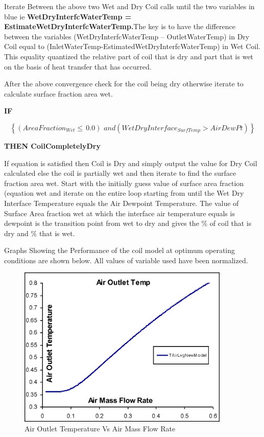 Iterate Between the above two Wet and Dry Coil calls until the two variables in blue ie \textbf{WetDryInterfcWaterTemp = EstimateWetDryInterfcWaterTemp.}The key is to have the difference between the variables (WetDryInterfcWaterTemp -- OutletWaterTemp) in Dry Coil equal to (InletWaterTemp-EstimatedWetDryInterfcWaterTemp) in Wet Coil. This equality quantized the relative part of coil that is dry and part that is wet on the basis of heat transfer that has occurred.

After the above convergence check for the coil being dry otherwise iterate to calculate surface fraction area wet.

\textbf{IF}

\begin{equation}
\left\{ {(AreaFractio{n_{Wet}} \le \,0.0)\,\,and(WetDryInterfac{e_{SurfTemp}} > AirDewPt)} \right\}
\end{equation}

\textbf{THEN CoilCompletelyDry}

If equation is satisfied then Coil is Dry and simply output the value for Dry Coil calculated else the coil is partially wet and then iterate to find the surface fraction area wet. Start with the initially guess value of surface area fraction (equation wet and iterate on the entire loop starting from until the Wet Dry Interface Temperature equals the Air Dewpoint Temperature. The value of Surface Area fraction wet at which the interface air temperature equals is dewpoint is the transition point from wet to dry and gives the \% of coil that is dry and \% that is wet.

Graphs Showing the Performance of the coil model at optimum operating conditions are shown below. All values of variable used have been normalized.

\begin{figure}[hbtp] %
\centering
\includegraphics[width=0.9\textwidth, height=0.9\textheight, keepaspectratio=true]{media/image3348.png}
\caption{Air Outlet Temperature Vs Air Mass Flow Rate \protect \label{fig:air-outlet-temperature-vs-air-mass-flow-rate}}
\end{figure}

